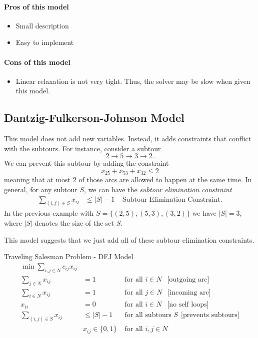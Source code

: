 \documentclass[../open-optimization/open-optimization.tex]{subfiles}
\begin{document}
\paragraph{Pros of this model}
\begin{itemize}
\item Small description
\item Easy to implement
\end{itemize}
\paragraph{Cons of this model}
\begin{itemize}
\item Linear relaxation is not very tight.  Thus, the solver may be slow when given this model.
\end{itemize}

\subsection{Dantzig-Fulkerson-Johnson Model}
This model does not add new variables.  Instead, it adds constraints that conflict with the subtours.  For instance, consider a subtour
\begin{equation}
2 \to 5 \to 3 \to 2.
\end{equation}
We can prevent this subtour by adding the constraint
\begin{equation}
x_{25} + x_{53} + x_{32}  \leq 2
\end{equation}
meaning that at most 2 of those arcs are allowed to happen at the same time.  In general, for any subtour $S$, we can have the \emph{subtour elimination constraint}
\begin{align}
\sum_{(i,j) \in S} x_{ij} &\leq |S| - 1  & \text{ Subtour Elimination Constraint}.
\end{align}
In the previous example with $S = \{(2,5), (5,3), (3,2)\}$ we have $|S| = 3$, where $|S|$ denotes the size of the set $S$.

This model suggests that we just add all of these subtour elimination constraints.

\begin{general}{Traveling Salesman Problem - DFJ Model}{}
\begin{align}
\label{eq:tsp-DFJ-model}
\min \sum_{i,j \in N} c_{ij} x_{ij}\\
\sum_{j\in N} x_{ij} &= 1 & \text{ for all } i \in N \ \ \text{ [outgoing arc]}\\
\sum_{i \in N} x_{ij} &= 1 & \text{ for all } j \in N \ \ \text{ [incoming arc]}\\
x_{ii} &= 0 & \text{ for all } i \in N \ \ \text{ [no self loops]} \\
\sum_{(i,j) \in S} x_{ij} &\leq |S| -1  & \text{ for all subtours } S \ \ \text{[prevents subtours]}\\
& x_{ij} \in \{0,1\} & \text{ for all } i,j \in N
\end{align}
\end{general}
\end{document}
